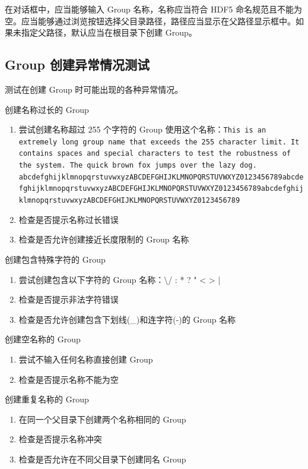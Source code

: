 \documentclass[a4paper,12pt]{report}	%
\begin{document}
在对话框中，应当能够输入 Group 名称，名称应当符合 HDF5 命名规范且不能为空。应当能够通过浏览按钮选择父目录路径，路径应当显示在父路径显示框中。如果未指定父路径，默认应当在根目录下创建 Group。 

\subsection{Group 创建异常情况测试}
测试在创建 Group 时可能出现的各种异常情况。

创建名称过长的 Group
\begin{enumerate}
    \item 尝试创建名称超过 255 个字符的 Group
        使用这个名称：\lstinline{This is an extremely long group name that exceeds the 255 character limit. It contains spaces and special characters to test the robustness of the system. The quick brown fox jumps over the lazy dog. abcdefghijklmnopqrstuvwxyzABCDEFGHIJKLMNOPQRSTUVWXYZ0123456789abcdefghijklmnopqrstuvwxyzABCDEFGHIJKLMNOPQRSTUVWXYZ0123456789abcdefghijklmnopqrstuvwxyzABCDEFGHIJKLMNOPQRSTUVWXYZ0123456789}
    \item 检查是否提示名称过长错误
    \item 检查是否允许创建接近长度限制的 Group 名称
\end{enumerate}
    
创建包含特殊字符的 Group
\begin{enumerate}
    \item 尝试创建包含以下字符的 Group 名称：\textbackslash / : * ? " < > |
    \item 检查是否提示非法字符错误
    \item 检查是否允许创建包含下划线(\_)和连字符(-)的 Group 名称
\end{enumerate}
    
创建空名称的 Group
\begin{enumerate}
    \item 尝试不输入任何名称直接创建 Group
    \item 检查是否提示名称不能为空
\end{enumerate}
    
创建重复名称的 Group
\begin{enumerate}
    \item 在同一个父目录下创建两个名称相同的 Group
    \item 检查是否提示名称冲突
    \item 检查是否允许在不同父目录下创建同名 Group
\end{enumerate}
\end{document}
